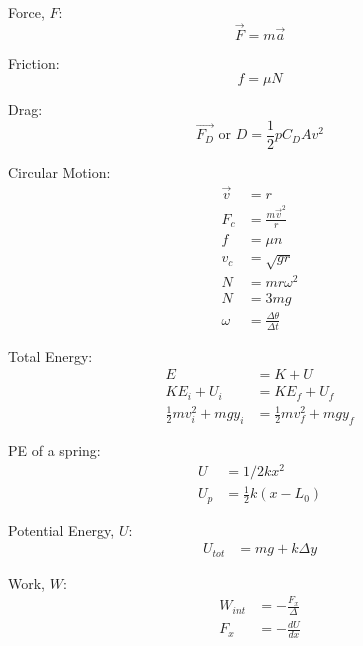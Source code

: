 \documentclass[10pt, letterpaper]{book}
\begin{document}
\begin{multicols*}{2}
        Force, $F$:
        \begin{equation}
            \vec{F} = m\vec{a}
        \end{equation}

        Friction:
        \begin{equation}
            f = \mu N
        \end{equation}

        Drag: 
        \begin{equation}
            \vec{F_D}\text{ or }D = \frac{1}{2}p C_{D}Av^{2}
        \end{equation}

        Circular Motion:
        \begin{align}
            \vec{v}         & = r                               \\
            F_{c}           & =\frac{m\vec{v}^{2}}{r}           \\
            f               & = \mu n                           \\
            v_{c}           & = \sqrt{gr}                       \\
            N               & = mr\omega^{2}                    \\
            N               & = 3mg                             \\
            \omega          & = \frac{\Delta \theta}{\Delta t}  
        \end{align}

        Total Energy:
        \begin{align}
            E   & = K + U   \\
            KE_{i} + U_{i}  & = KE_{f} + U_{f}  \\
            \frac{1}{2}mv^{2}_{i} + mgy_{i} & = \frac{1}{2}mv^{2}_{f} + mgy_{f}
        \end{align}

        PE of a spring:
        \begin{align}
            U     & = 1/2kx^{2}                 \\
            U_{p} & = \frac{1}{2}k(x-L_{0})
        \end{align}

        Potential Energy, $U$:
        \begin{align}
            U_{tot} & = mg + k\Delta y 
        \end{align}

        Work, $W$:
        \begin{align}
            W_{int} & = -\frac{F_{x}}{\Delta }   \\
            F_{x}   & = -\frac{dU}{dx}
        \end{align} 


\end{multicols*}
\end{document}
